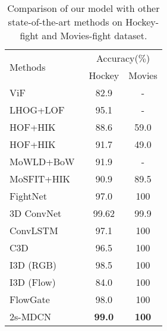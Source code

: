  \begin{table}[t]
 \caption{Comparison of our model with other state-of-the-art methods on Hockey-fight and Movies-fight dataset.}
    \begin{center}
		\begin{tabular}{lcc}
			\hline
			\multirow{2}{*}{Methods}	 & \multicolumn{2}{c}{Accuracy($\%$)} \\\cline{2-3}
						     									& Hockey   				& 	Movies    \\
			\hline
            ViF~\cite{hassner2012violent_6}           										& 82.9 									& - 								\\
            LHOG+LOF~\cite{lhog_zhou2018violence} 									& 95.1 									& - 								\\
            HOF+HIK~\cite{hog_nievas2011violence} 										& 88.6									& 59.0 								\\
            HOF+HIK~\cite{hog_nievas2011violence} 										& 91.7										& 49.0 								\\
            MoWLD+BoW~\cite{mowd_zhang2017mowld} 								& 91.9										& - 								\\
            MoSFIT+HIK~\cite{hog_nievas2011violence} 								& 90.9									& 89.5							\\
            \hline
             FightNet~\cite{26_zhou2017violent}										& 97.0									& 100							\\
            3D ConvNet~\cite{3dconvnet_song2019novel} 									& 99.62									& 99.9 							\\
            ConvLSTM~\cite{29_sudhakaran2017learning} 									& 97.1										& 100 								\\
            C3D~\cite{c3dtran2015learning} 												& 96.5									& 100 								\\
			I3D (RGB)~\cite{i3dcarreira2017quo} 										& 98.5									& 100 									\\
			I3D (Flow)~\cite{i3dcarreira2017quo} 										& 84.0									& 100 									\\
			FlowGate~\cite{cheng2019rwf}										& 98.0									& 100                               \\
			\hline
			2s-MDCN									& \textbf{99.0}						& \textbf{100}									\\
			\hline
		\end{tabular}		
    \end{center}
    \label{tab:hockey_movie}
	\end{table}
	